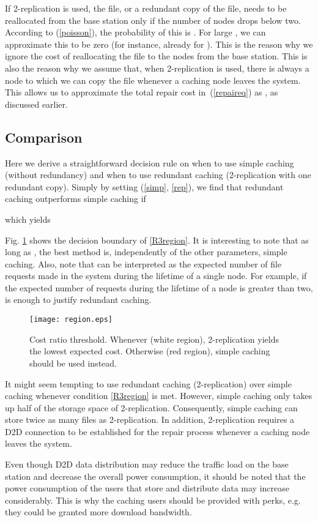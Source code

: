 \documentclass[10pt,conference]{IEEEtran}
\begin{document}
If 2-replication is used, the file, or a redundant copy of the file,
needs to be reallocated from the base station only if the number of
nodes drops below two. According to (\ref{poisson}), the probability
of this is . For large , we can approximate this
to be zero (for instance, already for ). This is the reason why we ignore the cost of
reallocating the file to the nodes from the base station. This is also
the reason why we assume that, when 2-replication is used, there is
always a node to which we can copy the file whenever a caching node
leaves the system. This allows us to approximate the total repair cost
in~(\ref{repaireq}) as , as discussed earlier.

\subsection{Comparison}
Here we derive a straightforward decision rule on when to use simple
caching (without redundancy) and when to use redundant caching
(2-replication with one redundant copy). Simply by setting
 (\eqref{simp}, \eqref{rep}), we
find that redundant caching outperforms simple caching if

which yields


Fig. \ref{region} shows the decision boundary of \eqref{R3region}.
It is interesting to note that as long as , the best method
is, independently of the other parameters, simple caching. Also, note
that  can be interpreted as the expected number of file
requests made in the system during the lifetime of a single node. For example, if the expected number of requests during the lifetime of a
node is greater than two,  is enough to justify redundant
caching.

\begin{figure}[tbhp]
\centering \texttt{[image: region.eps]}
\caption{Cost ratio threshold. Whenever  (white region), 2-replication yields the lowest expected cost. Otherwise (red region), simple caching should be used instead.}
\label{region}
\end{figure}
It might seem tempting to use redundant caching (2-replication) over
simple caching whenever condition \eqref{R3region} is met. However,
simple caching only takes up half of the storage space of
2-replication. Consequently, simple caching can store twice as many
files as 2-replication. In addition, 2-replication requires a D2D
connection to be established for the repair process whenever a caching
node leaves the system.

Even though D2D data distribution may reduce the traffic load on the base station and decrease the overall power consumption, it should be noted that the power consumption of the users that store and distribute data may increase considerably. This is why the caching users should be provided with perks, e.g. they could be granted more download bandwidth.
\end{document}
